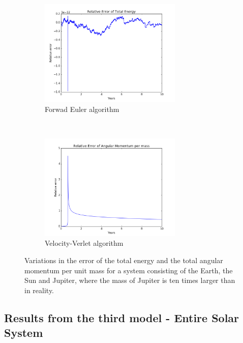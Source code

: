 \documentclass[a4paper, 10pt]{article}
\begin{document}
\begin{figure}[t!]
    \centering
    \begin{subfigure}[t]{0.5\textwidth}
        \centering
        \includegraphics[height=2.0in]{relErrEnSEJ.png}
        \caption{Forwad Euler algorithm}
    \end{subfigure}%
    ~ 
    \begin{subfigure}[t]{0.5\textwidth}
        \centering
        \includegraphics[height=2.0in]{relErrMomSEJ.png}
        \caption{Velocity-Verlet algorithm}
    \end{subfigure}
    \caption{Variations in the error of the total energy and the total angular momentum per unit mass for a system consisting of the Earth, the Sun and Jupiter, where the mass of Jupiter is ten times larger than in reality.}
\end{figure}


\subsection{Results from the third model - Entire Solar System}
\end{document}
